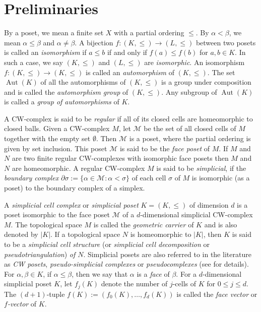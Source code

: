 \documentclass[12pt]{article}
\theoremstyle{theorem}
\theoremstyle{definition}
\begin{document}

\section{Preliminaries} 


By a poset, we mean  a finite set $X$ with a partial ordering $\leq$.  By $\alpha<\beta$, we mean $\alpha\leq \beta$ and $\alpha\neq \beta$. A bijection $f: (K, \leq) \to (L, \leq)$ between two posets is called an {\em isomorphism} if $a\leq b$ if and only if $f(a) \leq f(b)$ for $a, b\in K$. In such a case, we say $(K, \leq)$ and $(L, \leq)$  are {\em isomorphic}. An isomorphism $f : (K, \leq) \to (K, \leq)$ is called an {\em automorphism} of $(K, \leq)$. The set $\operatorname{Aut}(K)$ of all the automorphisms of $(K, \leq)$ is a group under composition and is called the {\em automorphism group} of $(K, \leq)$. Any subgroup of $\operatorname{Aut}(K)$ is called a {\em group of automorphisms} of $K$. 

A CW-complex is said to be {\em regular} if all of its closed cells are homeomorphic to closed balls. Given a CW-complex $M$, let ${\mathcal M}$ be the set of all closed cells of $M$ together with the empty set $\emptyset$. Then ${\mathcal M}$ is a poset, where the partial ordering is given by set inclusion. This poset ${\mathcal M}$ is said to be the {\em face poset} of $M$. If $M$ and $N$ are two finite regular CW-complexes with isomorphic face posets then $M$ and $N$ are homeomorphic. A regular CW-complex $M$ is said to be {\em simplicial}, if the {\em boundary complex} $\partial \sigma := \{\alpha\in {\mathcal M} : \alpha < \sigma\}$ of each cell $\sigma$ of $M$ is isomorphic (as a poset) to the boundary complex of a simplex.  


A {\em simplicial cell complex} or {\em simplicial poset} $K= (K,\leq)$ of dimension $d$ is a poset isomorphic to the face poset ${\mathcal M}$ of a $d$-dimensional simplicial CW-complex $M$. The topological space $M$ is called the {\em geometric carrier} of $K$ and is also denoted by $|K|$. If a topological space $N$ is homeomorphic to $|K|$, then $K$ is said to be a {\em simplicial cell structure} (or {\em simplicial cell decomposition} or {\em pseudotriangulation}) {\em of $N$}.  Simplicial posets are also referred to in the literature as {\em CW posets}, {\em pseudo-simplicial complexes} or {\em pseudocomplexes} (see \cite{Bj84, DS26, Mu13} for details). For $\alpha, \beta\in K$, if $\alpha\leq\beta$, then we say that $\alpha$ is a {\em face} of $\beta$. For a $d$-dimensional simplicial poset $K$, let $f_j(K)$ denote the number of $j$-cells of $K$ for $0\leq j\leq d$. The $(d+1)$-tuple $f(K) := (f_0(K), \dots, f_d(K))$ is called the {\it face vector} or {\em $f$-vector} of $K$. 
\end{document}
